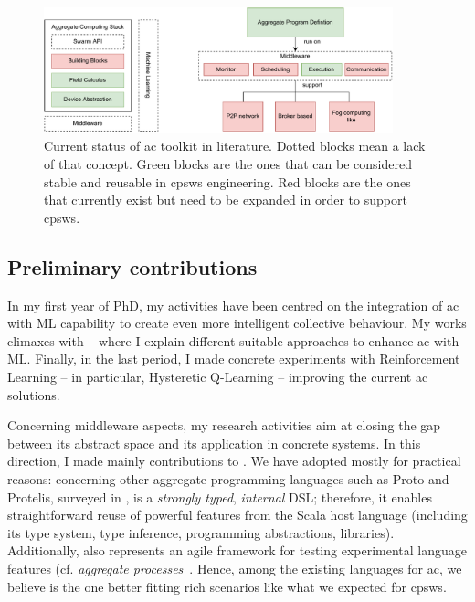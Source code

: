 \documentclass[11pt]{article}
\begin{document}
\begin{figure}[t]
	\centering
	\includegraphics[width=0.9\textwidth]{img/to-do-for-thesis.pdf}
	\caption{Current status of \ac{ac} toolkit in literature. Dotted blocks mean a lack of that concept. Green blocks are the ones that can be considered stable and reusable in \acp{cpsw} engineering. Red blocks are the ones that currently exist but need to be expanded in order to support \acp{cpsw}.}
	\label{fig:current-state}
\end{figure}
\subsection{Preliminary contributions}
In my first year of PhD, my activities have been centred on
the integration of \ac{ac} with ML capability to create even more
intelligent collective behaviour. 
%
My works climaxes with ~\cite{research} where I explain different suitable approaches to
enhance \ac{ac} with ML. Finally, in the last period, I made concrete
experiments with Reinforcement Learning -- in particular, Hysteretic Q-Learning \cite{hysteretic-q} -- improving the current \ac{ac} solutions.

Concerning middleware aspects, my research activities aim at closing the gap between
its abstract space and its application in concrete systems. In this direction, I made mainly contributions to \scafi{}.
%
We have adopted \scafi{} mostly for practical reasons: concerning other aggregate programming languages such as Proto and Protelis, surveyed in \cite{viroli2019jlamp-si-coord},
\scafi{} is a \emph{strongly typed}, \emph{internal} DSL; therefore, it enables straightforward reuse of powerful features from the Scala host language (including its type system, type inference, programming abstractions, libraries).
%
Additionally, \scafi{} also represents an agile framework for testing experimental language features (cf. \emph{aggregate processes}~\cite{DBLP:journals/eaai/CasadeiVAPD21}.
%
Hence, among the existing languages for \ac{ac}, we believe \scafi{} is the one better fitting rich scenarios like what we expected for \acp{cpsw}.
\end{document}
